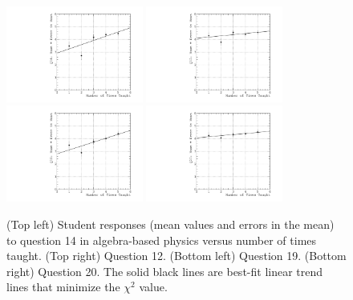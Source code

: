 \documentclass[../../main.tex]{subfiles}
\begin{document}
\begin{figure}
\centering
\includegraphics[width=0.4\textwidth]{Q14_algebra_based.pdf}
\includegraphics[width=0.4\textwidth]{Q12_algebra_based.pdf}
\includegraphics[width=0.4\textwidth]{Q19_algebra_based.pdf}
\includegraphics[width=0.4\textwidth]{Q20_algebra_based.pdf}
\caption{\label{fig:courses:intro_q14}  (Top left) Student responses (mean values and errors in the mean) to question 14 in algebra-based physics versus number of times taught.  (Top right) Question 12. (Bottom left) Question 19. (Bottom right) Question 20.  The solid black lines are best-fit linear trend lines that minimize the $\chi^2$ value.}
\end{figure}
\end{document}
